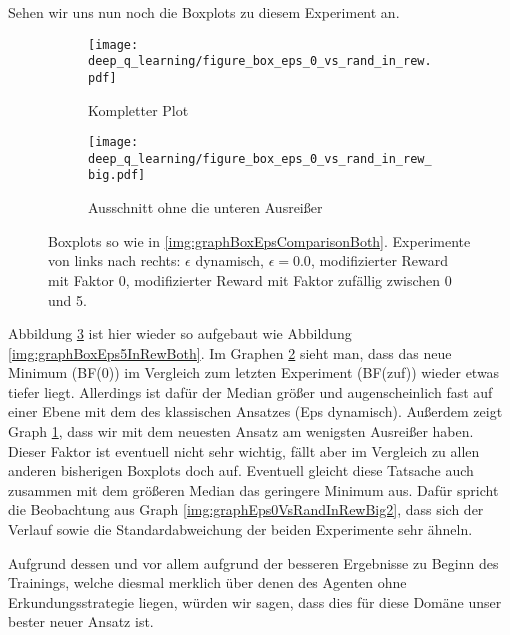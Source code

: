 Sehen wir uns nun noch die Boxplots zu diesem Experiment an.
\begin{figure}[h!]
    \centering
    \begin{subfigure}[b]{0.7\textwidth}
        \texttt{[image: deep\_q\_learning/figure\_box\_eps\_0\_vs\_rand\_in\_rew.pdf]}
        \caption{Kompletter Plot}
        \label{img:graphBoxEps0VsRandInRew}
    \end{subfigure}
    \begin{subfigure}[b]{0.7\textwidth}
        \texttt{[image: deep\_q\_learning/figure\_box\_eps\_0\_vs\_rand\_in\_rew\_big.pdf]}
        \caption{Ausschnitt ohne die unteren Ausreißer}
        \label{img:graphBoxEps0VsRandInRewBig}
    \end{subfigure}
    \caption{Boxplots so wie in \ref{img:graphBoxEpsComparisonBoth}. Experimente von links nach rechts: $ \epsilon $ dynamisch, $ \epsilon = 0.0 $, modifizierter Reward mit Faktor 0, modifizierter Reward mit Faktor zufällig zwischen 0 und 5.}
    \label{img:graphBoxEps0VsRandInRewBoth}
\end{figure}
Abbildung \ref{img:graphBoxEps0VsRandInRewBoth} ist hier wieder so aufgebaut wie Abbildung \ref{img:graphBoxEps5InRewBoth}. Im Graphen \ref{img:graphBoxEps0VsRandInRewBig} sieht man, dass das neue Minimum (BF(0)) im Vergleich zum letzten Experiment (BF(zuf)) wieder etwas tiefer liegt. Allerdings ist dafür der Median größer und augenscheinlich fast auf einer Ebene mit dem des klassischen Ansatzes (Eps dynamisch). Außerdem zeigt Graph \ref{img:graphBoxEps0VsRandInRew}, dass wir mit dem neuesten Ansatz am wenigsten Ausreißer haben. Dieser Faktor ist eventuell nicht sehr wichtig, fällt aber im Vergleich zu allen anderen bisherigen Boxplots doch auf. Eventuell gleicht diese Tatsache auch zusammen mit dem größeren Median das geringere Minimum aus. Dafür spricht die Beobachtung aus Graph \ref{img:graphEps0VsRandInRewBig2}, dass sich der Verlauf sowie die Standardabweichung der beiden Experimente sehr ähneln.

Aufgrund dessen und vor allem aufgrund der besseren Ergebnisse zu Beginn des Trainings, welche diesmal merklich über denen des Agenten ohne Erkundungsstrategie liegen, würden wir sagen, dass dies für diese Domäne unser bester neuer Ansatz ist.
